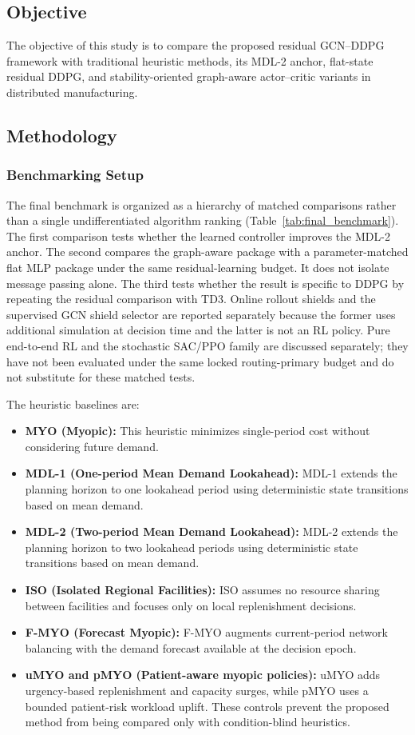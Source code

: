 \documentclass[preprint,review,12pt]{elsarticle}
\begin{document}
\subsection{Objective}
The objective of this study is to compare the proposed residual GCN--DDPG framework with traditional heuristic methods, its MDL-2 anchor, flat-state residual DDPG, and stability-oriented graph-aware actor--critic variants in distributed manufacturing.

\subsection{Methodology}

\subsubsection{Benchmarking Setup}
The final benchmark is organized as a hierarchy of matched comparisons rather
than a single undifferentiated algorithm ranking (Table~\ref{tab:final_benchmark}).
The first comparison tests whether the learned controller improves the MDL-2
anchor. The second compares the graph-aware package with a parameter-matched
flat MLP package under the same residual-learning budget. It does not isolate
message passing alone. The third
tests whether the result is specific to DDPG by repeating the residual
comparison with TD3. Online rollout shields and the supervised GCN shield
selector are reported separately because the former uses additional simulation
at decision time and the latter is not an RL policy. Pure end-to-end RL and the
stochastic SAC/PPO family are discussed separately; they have not been evaluated
under the same locked routing-primary budget and do not substitute for these
matched tests.

The heuristic baselines are:
\begin{itemize}
\item \textbf{MYO (Myopic):} This heuristic minimizes single-period cost without considering future demand.
\item \textbf{MDL-1 (One-period Mean Demand Lookahead):} MDL-1 extends the planning horizon to one lookahead period using deterministic state transitions based on mean demand.
\item \textbf{MDL-2 (Two-period Mean Demand Lookahead):} MDL-2 extends the planning horizon to two lookahead periods using deterministic state transitions based on mean demand.
\item \textbf{ISO (Isolated Regional Facilities):} ISO assumes no resource sharing between facilities and focuses only on local replenishment decisions.
\item \textbf{F-MYO (Forecast Myopic):} F-MYO augments current-period network balancing with the demand forecast available at the decision epoch.
\item \textbf{uMYO and pMYO (Patient-aware myopic policies):} uMYO adds urgency-based replenishment and capacity surges, while pMYO uses a bounded patient-risk workload uplift. These controls prevent the proposed method from being compared only with condition-blind heuristics.
\end{itemize}
\end{document}
